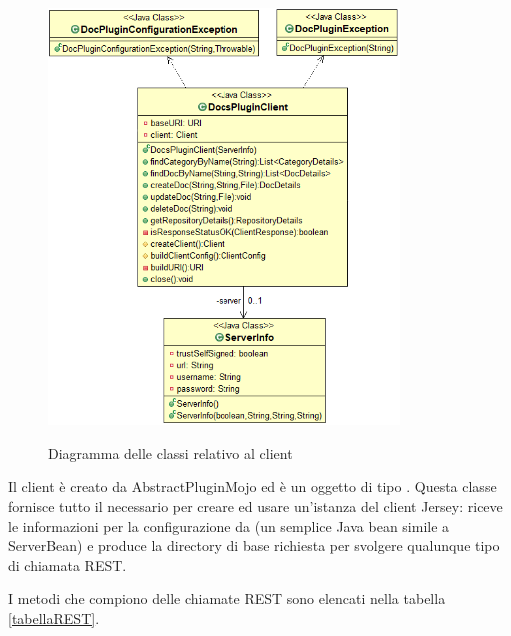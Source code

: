 \begin{figure}[H]
    \centering
    \includegraphics[width=0.83\textwidth]{immagini/client.png}\\
    \caption{Diagramma delle classi relativo al client}
\end{figure}

Il client è creato da AbstractPluginMojo ed è un oggetto di tipo .
Questa classe fornisce tutto il necessario per creare ed usare un'istanza del client Jersey: riceve le informazioni per la configurazione da  (un semplice Java bean simile a ServerBean) e produce la directory di base richiesta per svolgere qualunque tipo di chiamata REST.

I metodi che compiono delle chiamate REST \cite{site:rest-docs} sono elencati nella tabella \ref{tabellaREST}.

